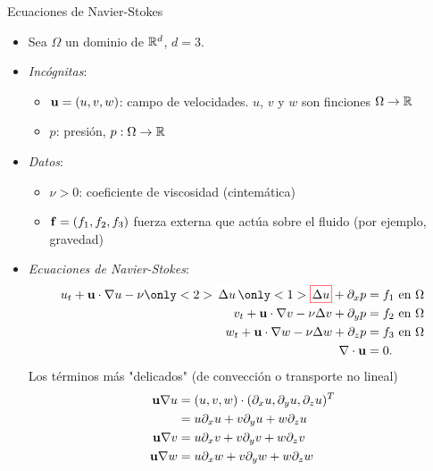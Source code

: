 \documentclass[8pt]{beamer}
\newcommand{\matcolbox}[2][red]{\fcolorbox{#1}{white}{$\!#2\!$}}
\begin{document}
\begin{frame}{Ecuaciones de Navier-Stokes}
  \begin{itemize}
  \item Sea $\Omega$ un dominio de ${\mathbb R}^d$, $d=3$.
  \item \emph{Incógnitas}:
  \begin{itemize}
      \item $\mathbf{u}=(u,v,w)$: campo de velocidades. $u$, $v$ y $w$ son finciones $\Omega \to {\mathbb R}$
      \item $p$: presión, $p:\Omega \to {\mathbb R}$
  \end{itemize}
  \item \emph{Datos}:
  \begin{itemize}
    \item $\nu>0$: coeficiente de viscosidad (cintemática)
      \item $\mathbf{f}=(f_1,f_2,f_3)$ fuerza externa que actúa sobre el fluido (por ejemplo, gravedad)
  \end{itemize}
  \item \emph{Ecuaciones de Navier-Stokes}:
  \begin{align}
    u_t + \uu\cdot\grad u - \nu
    \only<2>{\matcolbox[white]{\Delta u}{}}
    \only<1>{\matcolbox{\Delta u}}
    + \dx p &= f_1 \text{ en } \Omega
    \\
    v_t + \uu\cdot\grad v - \nu\Delta v + \dy p &= f_2 \text{ en } \Omega
    \\
    w_t + \uu\cdot\grad w - \nu\Delta w + \dz p &= f_3 \text{ en } \Omega
    \\
    \div{\uu} &= 0.
  \end{align}
  Los términos más "delicados" (de convección o transporte no lineal)
  \begin{align}
  \mathbf{u}\nabla u &= (u,v,w) \cdot (\partial_x u, \partial_y u, \partial_z u)^T \\
  &= u \partial_x u + v \partial_y u + w \partial_z u
  \\
  \mathbf{u}\nabla v &= u \partial_x v + v \partial_y v + w \partial_z v
  \\
  \mathbf{u}\nabla w &= u \partial_x w + v \partial_y w + w \partial_z w
\end{align}
  \end{itemize}
\end{frame}
\end{document}
